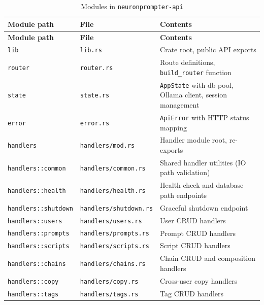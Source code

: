 \documentclass[a4paper, 11pt, oneside]{report}
\begin{document}
{\footnotesize
\begin{longtable}{L{4cm} L{4.8cm} L{5.8cm}}
  \caption{Modules in \texttt{neuronprompter-api}}
  \label{tab:mod-api} \\
  \toprule
  \textbf{Module path} & \textbf{File} & \textbf{Contents} \\
  \midrule
  \endfirsthead
  \toprule
  \textbf{Module path} & \textbf{File} & \textbf{Contents} \\
  \midrule
  \endhead
  \texttt{lib}                    & \texttt{lib.rs}                 & Crate root, public API exports \\
  \texttt{router}                 & \texttt{router.rs}              & Route definitions, \texttt{build\_router} function \\
  \texttt{state}                  & \texttt{state.rs}               & \texttt{AppState} with db pool, Ollama client,
                                                                      session management \\
  \texttt{error}                  & \texttt{error.rs}               & \texttt{ApiError} with HTTP status mapping \\
  \texttt{handlers}               & \texttt{handlers/mod.rs}        & Handler module root, re-exports \\
  \texttt{handlers::common}       & \texttt{handlers/common.rs}     & Shared handler utilities (IO path validation) \\
  \texttt{handlers::health}       & \texttt{handlers/health.rs}     & Health check and database path endpoints \\
  \texttt{handlers::shutdown}     & \texttt{handlers/shutdown.rs}   & Graceful shutdown endpoint \\
  \texttt{handlers::users}        & \texttt{handlers/users.rs}      & User CRUD handlers \\
  \texttt{handlers::prompts}      & \texttt{handlers/prompts.rs}    & Prompt CRUD handlers \\
  \texttt{handlers::scripts}      & \texttt{handlers/scripts.rs}    & Script CRUD handlers \\
  \texttt{handlers::chains}       & \texttt{handlers/chains.rs}     & Chain CRUD and composition handlers \\
  \texttt{handlers::copy}         & \texttt{handlers/copy.rs}       & Cross-user copy handlers \\
  \texttt{handlers::tags}         & \texttt{handlers/tags.rs}       & Tag CRUD handlers \\

\end{longtable}}
\end{document}
